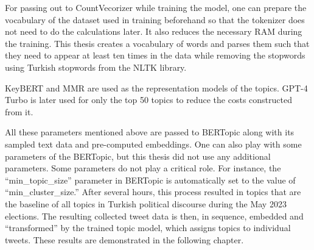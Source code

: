 For passing out to CountVecorizer while training the model, one can prepare the vocabulary 
of the dataset used in training beforehand so that the tokenizer does not need to do the 
calculations later. It also reduces the necessary RAM during the training. This thesis 
creates a vocabulary of words and parses them such that they need to appear at least ten 
times in the data while removing the stopwords using Turkish stopwords from the NLTK library. 

KeyBERT and MMR are used as the representation models of the topics. GPT-4 Turbo is later 
used for only the top 50 topics to reduce the costs constructed from it. 

All these parameters mentioned above are passed to BERTopic along with its sampled text 
data and pre-computed embeddings. One can also play with some parameters of the BERTopic, 
but this thesis did not use any additional parameters. Some parameters do not play a 
critical role. For instance, the ``min\_topic\_size'' parameter in BERTopic is automatically 
set to the value of ``min\_cluster\_size.'' After several hours, this process resulted in 
topics that are the baseline of all topics in Turkish political discourse during the May 
2023 elections. The resulting collected tweet data is then, in sequence, embedded and 
``transformed'' by the trained topic model, which assigns topics to individual tweets. 
These results are demonstrated in the following chapter.
